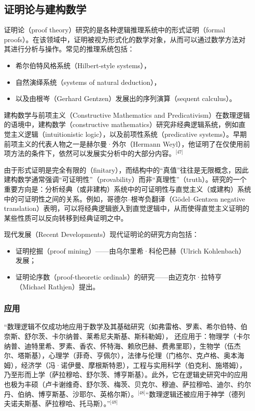 \subsection{证明论与建构数学}
证明论（proof theory）研究的是各种逻辑推理系统中的形式证明（formal proofs）。在该领域中，证明被视为形式化的数学对象，从而可以通过数学方法对其进行分析与操作。常见的推理系统包括：
\begin{itemize}
  \item 希尔伯特风格系统（Hilbert-style systems），
  \item 自然演绎系统（systems of natural deduction），
  \item 以及由根岑（Gerhard Gentzen）发展出的序列演算（sequent calculus）。
\end{itemize}
建构数学与前项主义（Constructive Mathematics and Predicativism）在数理逻辑的语境中，建构数学（constructive mathematics）研究非经典逻辑系统，例如直觉主义逻辑（intuitionistic logic），以及前项性系统（predicative systems）。早期前项主义的代表人物之一是赫尔曼·外尔（Hermann Weyl），他证明了在仅使用前项方法的条件下，依然可以发展实分析中的大部分内容。\(^\text{[47]}\)

由于形式证明是完全有限的（finitary），而结构中的“真值”往往是无限概念，因此建构数学通常强调“可证明性”（provability）而非“真理性”（truth）。研究的一个重要方向是：分析经典（或非建构）系统中的可证明性与直觉主义（或建构）系统中的可证明性之间的关系。例如，哥德尔–根岑负翻译（Gödel–Gentzen negative translation）表明，可以将经典逻辑嵌入到直觉逻辑中，从而使得直觉主义证明的某些性质可以反向转移到经典证明之中。

现代发展（Recent Developments）现代证明论的研究方向包括：
\begin{itemize}
  \item 证明挖掘（proof mining）——由乌尔里希·科伦巴赫（Ulrich Kohlenbach）发展；
  \item 证明论序数（proof-theoretic ordinals）的研究——由迈克尔·拉特亨（Michael Rathjen）提出。
\end{itemize}
\subsubsection{应用}
“数理逻辑不仅成功地应用于数学及其基础研究（如弗雷格、罗素、希尔伯特、伯奈斯、舒尔茨、卡尔纳普、莱希尼夫斯基、斯科勒姆），  
还应用于：物理学（卡尔纳普、迪特里希、罗素、香农、怀特海、赖欣巴赫、费弗里耶），生物学（伍杰尔、塔斯基），心理学（菲奇、亨佩尔），法律与伦理（门格尔、克卢格、奥本海姆），经济学（冯·诺伊曼、摩根斯特恩），工程与实用科学（伯克利、施塔姆），乃至形而上学（萨拉穆哈、舒尔茨、博亨斯基）。此外，它在逻辑史研究中的应用也极为丰硕（卢卡谢维奇、舒尔茨、梅茨、贝克尔、穆迪、萨拉穆哈、迪尔、约尔丹、伯纳、博亨斯基、沙耶尔、英格尔斯）。\(^\text{[48]}\)“数理逻辑还被应用于神学（德列夫诺夫斯基、萨拉穆哈、托马斯）。”\(^\text{[48]}\)
